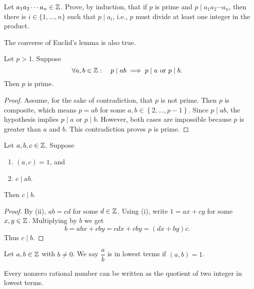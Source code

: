 \documentclass[11pt,a4paper]{article}
\begin{document}
\begin{eje}
    Let \(a_1 a_2 \cdots a_n\in \mathbb{Z}\).
    Prove, by induction, that if \(p\) is prime and \(p\mid a_1 a_2 \cdots a_n\), then there is \(i\in \{1,\ldots,n\}\) such that \(p\mid a_i\), i.e., \(p\) must divide at least one integer in the product.
\end{eje}

The converse of Euclid's lemma is also true.

\begin{prop}
    Let \(p>1\).
    Suppose
    \[\forall a,b\in \mathbb{Z}  :\quad p\mid ab\implies p\mid a \text{  or  } p\mid b.\]
    Then \(p\) is prime.
\end{prop}

\begin{proof}
    Assume, for the sake of contradiction, that \(p\) is not prime.
    Then \(p\) is composite, which means \(p=ab\) for some \(a,b\in \left\{ 2,\ldots, p-1 \right\}\).
    Since \(p\mid ab\), the hypothesis implies \(p\mid a\) or \(p\mid b\).
    However, both cases are impossible because \(p\) is greater than \(a\) and \(b\).
    This contradiction proves \(p\) is prime.
\end{proof}


\begin{prop}
    Let \(a,b,c\in \mathbb{Z}\).
    Suppose
    \begin{enumerate}[label=(\roman*)]
        \item \((a,c) = 1\), and
        \item \(c\mid ab\).
    \end{enumerate}
    Then \(c\mid b\).
\end{prop}


\begin{proof}
    By (ii), \(ab=cd\) for some \(d\in\mathbb{Z}\).
    Using (i), write \(1 = ax+cy\) for some \(x,y\in \mathbb{Z}\). Multiplying by \(b\) we get 
    \[b = abx + cby = cdx + cby = (dx + by)c.\]
    Thus \(c\mid b\).
\end{proof}



\begin{defi}
    Let \(a,b\in \mathbb{Z}\) with \(b\neq 0\). We say \(\dfrac{a}{b}    \) is in lowest terms if \((a,b) = 1\).
\end{defi}

\begin{lem}
    Every nonzero rational number can be written as the quotient of two integer  in lowest terms.
\end{lem}
\end{document}

